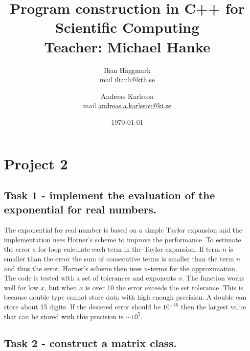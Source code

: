 \documentclass[paper=a4, fontsize=11pt]{article} %
\title{Program construction in C++ for Scientific Computing \\ Teacher: Michael Hanke}
\author{Ilian H{\"a}ggmark \\ mail \href{mailto:ilianh@kth.se}{ilianh@kth.se}
  \and Andreas Karlsson \\ mail \href{mailto:andreas.a.karlsson@ki.se}{andreas.a.karlsson@ki.se} }
\date{\normalsize\today} %
\begin{document}
\maketitle %

\section{Project 2}
\subsection{Task 1 - implement the evaluation of the exponential for real numbers.}

The exponential for real number is based on a simple Taylor expansion and the implementation uses Horner’s scheme to improve the performance.
To estimate the error a for-loop calculate each term in the Taylor expansion. If term $n$ is smaller than the error the sum of consecutive terms is smaller than the term $n$ and thus the error. Horner’s scheme then uses $n$-terms for the approximation.
The code is tested with a set of tolerances and exponents $x$. The function works well for low $x$, but when $x$ is over 10 the error exceeds the set tolerance. This is because double type cannot store data with high enough precision. A double can store about 15 digits. If the desiered error should be $10^{-10}$ then the largest value that can be stored with this precision is $\sim 10^{5}$.


\subsection{Task 2 - construct a matrix class.}
\end{document}
